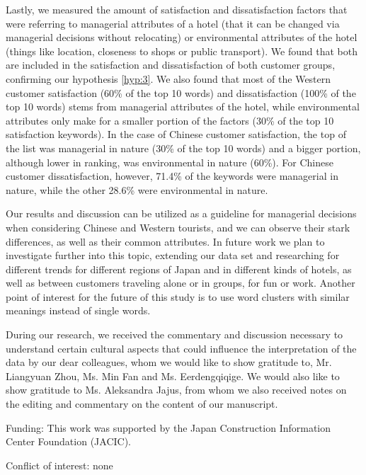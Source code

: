 Lastly, we measured the amount of satisfaction and dissatisfaction factors that were referring to managerial attributes of a hotel (that it can be changed via managerial decisions without relocating) or environmental attributes of the hotel (things like location, closeness to shops or public transport). We found that both are included in the satisfaction and dissatisfaction of both customer groups, confirming our hypothesis \ref{hyp:3}. We also found that most of the Western customer satisfaction (60\% of the top 10 words) and dissatisfaction (100\% of the top 10 words) stems from managerial attributes of the hotel, while environmental attributes only make for a smaller portion of the factors (30\% of the top 10 satisfaction keywords). In the case of Chinese customer satisfaction, the top of the list was managerial in nature (30\% of the top 10 words) and a bigger portion, although lower in ranking, was environmental in nature (60\%). For Chinese customer dissatisfaction, however, 71.4\% of the keywords were managerial in nature, while the other 28.6\% were environmental in nature.

Our results and discussion can be utilized as a guideline for managerial decisions when considering Chinese and Western tourists, and we can observe their stark differences, as well as their common attributes. In future work we plan to investigate further into this topic, extending our data set and researching for different trends for different regions of Japan and in different kinds of hotels, as well as between customers traveling alone or in groups, for fun or work. Another point of interest for the future of this study is to use word clusters with similar meanings instead of single words. 

\begin{acknowledgements}

During our research, we received the commentary and discussion necessary to understand certain cultural aspects that could influence the interpretation of the data by our dear colleagues, whom we would like to show gratitude to, Mr. Liangyuan Zhou, Ms. Min Fan and Ms. Eerdengqiqige. We would also like to show gratitude to Ms. Aleksandra Jajus, from whom we also received notes on the editing and commentary on the content of our manuscript.

\medskip

Funding: This work was supported by the Japan Construction Information Center Foundation (JACIC).

\medskip

Conflict of interest: none

\end{acknowledgements}


